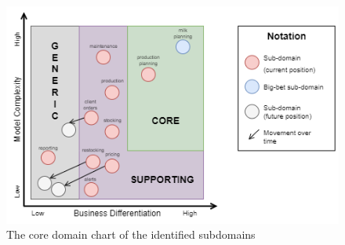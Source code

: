 \begin{figure}[H]
	\centering
	\includegraphics[width=\textwidth]{img/core-domain-chart.png}
	\caption{The core domain chart of the identified subdomains}
	\label{img:core-domain-chart}
\end{figure}
